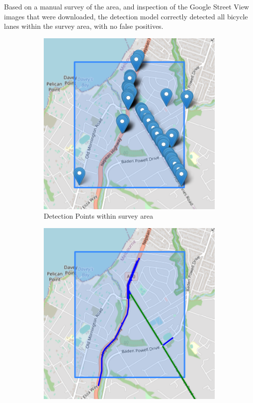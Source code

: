 \documentclass[11pt,twoside]{report}
\begin{document}
Based on a manual survey of the area, and inspection of the Google Street View images that were downloaded, the detection model correctly detected all bicycle lanes within the survey area, with no false positives.
 
\begin{figure}[h]
\centering
\begin{subfigure}{0.45\textwidth}
	\includegraphics[width=\textwidth]{map1_1.png}
	\caption{Detection Points within survey area}
	\label{fig:rq2a}
\end{subfigure}
\hfill
\begin{subfigure}{0.45\textwidth}
	\includegraphics[width=\textwidth]{map1_4.png}

\end{subfigure}
\end{figure}
\end{document}
